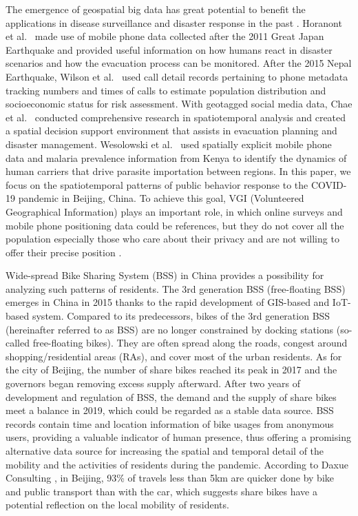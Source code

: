 \documentclass[ijgi,submit,moreauthors,pdftex]{Definitions/mdpi}
\begin{document}
The emergence of geospatial big data has great potential to benefit the applications in disease surveillance and disaster response in the past \cite{Yu2018Big, Goodchild2010Crowdsourcing, Huang2015Predicating}.
Horanont et al.\ \cite{Horanont2013Auto} made use of mobile phone data collected after the 2011 Great Japan Earthquake and provided useful information on how humans react in disaster scenarios and how the evacuation process can be monitored.
After the 2015 Nepal Earthquake, Wilson et al.\ \cite{Wilson2016Rapid} used call detail records pertaining to phone metadata tracking numbers and times of calls to estimate population distribution and socioeconomic status for risk assessment.
With geotagged social media data, Chae et al.\ \cite{CHAE2013Public} conducted comprehensive research in spatiotemporal analysis and created a spatial decision support environment that assists in evacuation planning and disaster management.
Wesolowski et al.\ \cite{Wesolowski2012Quantifying} used spatially explicit mobile phone data and malaria prevalence information from Kenya to identify the dynamics of human carriers that drive parasite importation between regions. 
In this paper, we focus on the spatiotemporal patterns of public behavior response to the COVID-19 pandemic in Beijing, China.
To achieve this goal, VGI (Volunteered Geographical Information) plays an important role, in which online surveys and mobile phone positioning data could be references, but they do not cover all the population especially those who care about their privacy and are not willing to offer their precise position \cite{Li2016ISPRS}. 

Wide-spread Bike Sharing System (BSS) in China provides a possibility for analyzing such patterns of residents.
The 3rd generation BSS (free-floating BSS) emerges in China in 2015 thanks to the rapid development of GIS-based and IoT-based system. 
Compared to its predecessors, bikes of the 3rd generation BSS (hereinafter referred to as BSS) are no longer constrained by docking stations (so-called free-floating bikes).
They are often spread along the roads, congest around shopping/residential areas (RAs), and cover most of the urban residents. 
As for the city of Beijing, the number of share bikes reached its peak in 2017 and the governors began removing excess supply afterward. 
After two years of development and regulation of BSS, the demand and the supply of share bikes meet a balance in 2019, which could be regarded as a stable data source.
BSS records contain time and location information of bike usages from anonymous users, providing a valuable indicator of human presence, thus offering a promising alternative data source for increasing the spatial and temporal detail of the mobility and the activities of residents during the pandemic.
According to Daxue Consulting \cite{bssmodel}, in Beijing, 93\% of travels less than 5km are quicker done by bike and public transport than with the car, which suggests share bikes have a potential reflection on the local mobility of residents.
\end{document}
